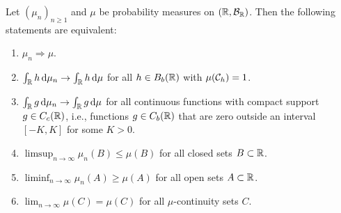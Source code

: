 \begin{theorem}%
Let $(\mu_n)_{n \ge 1}$ and $\mu$ be probability measures on $(\mathbb R, \mathcal B_{\mathbb R})$. Then the following statements are equivalent:
\begin{enumerate}[label={(\arabic*)}]
\item $\mu_n \Rightarrow \mu$.
\item $\int_{\mathbb R} h \, \mathrm{d} \mu_n \to \int_{\mathbb R} h \, \mathrm{d} \mu$ for all $h\in B_b(\mathbb R)$ with $\mu(\mathcal C_h) = 1$.
\item $\int_{\mathbb R} g \, \mathrm{d} \mu_n \to \int_{\mathbb R} g \, \mathrm{d} \mu$ for all continuous functions with compact support $g\in C_c(\mathbb R)$, i.e., functions $g\in C_b(\mathbb R)$ that are zero outside an interval $[-K,K]$ for some $K > 0$.
\item $\limsup_{n \to \infty} \mu_n(B) \le \mu(B)$ for all closed sets $B \subset \mathbb R$.
\item $\liminf_{n \to \infty} \mu_n(A) \ge \mu(A)$ for all open sets $A \subset \mathbb R$.
\item $\lim_{n \to \infty} \mu(C) = \mu(C)$ for all $\mu$-continuity sets $C$.
\end{enumerate}
\end{theorem} 

